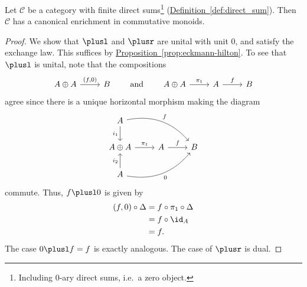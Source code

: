 \documentclass[main.tex]{subfiles}
\begin{document}
\begin{proposition}
  Let $\mathcal{C}$ be a category with finite direct sums\footnote{Including 0-ary direct sums, i.e.\ a zero object.} (\hyperref[def:direct_sum]{Definition~\ref*{def:direct_sum}}). Then $\mathcal{C}$ has a canonical enrichment in commutative monoids.
\end{proposition}
\begin{proof}
  We show that $\plusl$ and $\plusr$ are unital with unit $0$, and satisfy the exchange law. This suffices by \hyperref[prop:eckmann-hilton]{Proposition~\ref*{prop:eckmann-hilton}}. To see that $\plusl$ is unital, note that the compositions
  \begin{equation*}
    \begin{tikzcd}
      A \oplus A
      \arrow[r, "{(f, 0)}"]
      & B
    \end{tikzcd}
    \qquad\text{and}\qquad
    \begin{tikzcd}
      A \oplus A
      \arrow[r, "\pi_{1}"]
      & A
      \arrow[r, "f"]
      & B
    \end{tikzcd}
  \end{equation*}
  agree since there is a unique horizontal morphism making the diagram
  \begin{equation*}
    \begin{tikzcd}
      A
      \arrow[drr, bend left, "f"]
      \arrow[d, swap, "i_{1}"]
      \\
      A \oplus A
      \arrow[r, "\pi_{1}"]
      & A
      \arrow[r, "f"]
      & B
      \\
      A
      \arrow[urr, bend right, swap, "0"]
      \arrow[u, "i_{2}"]
    \end{tikzcd}
  \end{equation*}
  commute. Thus, $f \plusl 0$ is given by
  \begin{align*}
    (f, 0) \circ \Delta &= f \circ \pi_{1} \circ \Delta \\
    &= f \circ \id_{A} \\
    &= f.
  \end{align*}
  The case $0 \plusl f = f$ is exactly analogous. The case of $\plusr$ is dual.


\end{proof}
\end{document}
